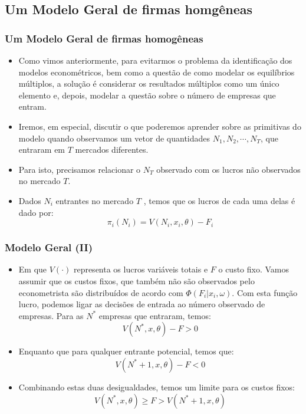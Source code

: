 \documentclass{beamer}
\begin{document}
\subsection{Um Modelo Geral de firmas homgêneas}
\begin{frame}\frametitle{Um Modelo Geral de firmas homogêneas}
\footnotesize
\begin{itemize}
\item Como vimos anteriormente, para evitarmos o problema da identificação
dos modelos econométricos, bem como a questão de como modelar os equilíbrios
múltiplos, a solução é considerar os resultados múltiplos como um
único elemento e, depois, modelar a questão sobre o número de empresas
que entram.
\item Iremos, em especial, discutir o que poderemos aprender sobre as primitivas
do modelo quando observamos um vetor de quantidades $N_{1},N_{2},\cdots,N_{T}$,
que entraram em $T$ mercados diferentes. 
\item Para isto, precisamos relacionar o $N_{T}$ observado com os lucros
não observados no mercado $T$. 
\item Dados $N_{i}$ entrantes no mercado $T$ , temos que os lucros de
cada uma delas é dado por:
\[
\pi_{i}(N_{i})=V(N_{i},x_{i},\theta)-F_{i}
\]
\end{itemize}
\end{frame}

\begin{frame}\frametitle{Modelo Geral (II)}

\begin{itemize}
\item Em que $V(\cdot)$ representa os lucros variáveis totais e $F$ o
custo fixo. Vamos assumir que os custos fixos, que também não são
observados pelo econometrista são distribuídos de acordo com $\Phi(F_{i}|x_{i},\omega)$.
Com esta função lucro, podemos ligar as decisões de entrada ao número
observado de empresas. Para as $N^{*}$ empresas que entraram, temos:
\[
V(N^{*},x,\theta)-F>0
\]
\item Enquanto que para qualquer entrante potencial, temos que:
\[
V(N^{*}+1,x,\theta)-F<0
\]
\item Combinando estas duas desigualdades, temos um limite para os custos
fixos:
\[
V(N^{*},x,\theta)\geq F>V(N^{*}+1,x,\theta)
\]
\end{itemize}
\end{frame}
\end{document}

